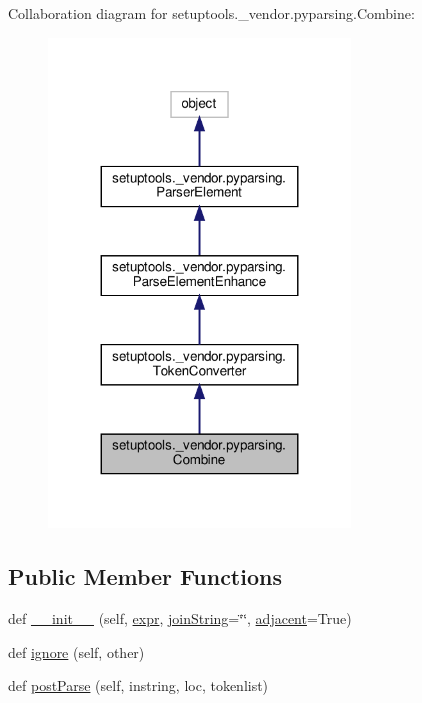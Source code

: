 Collaboration diagram for setuptools.\+\_\+vendor.\+pyparsing.\+Combine\+:
\nopagebreak
\begin{figure}[H]
\begin{center}
\leavevmode
\includegraphics[width=227pt]{classsetuptools_1_1__vendor_1_1pyparsing_1_1Combine__coll__graph}
\end{center}
\end{figure}
\subsection*{Public Member Functions}
\begin{DoxyCompactItemize}
\item 
def \hyperlink{classsetuptools_1_1__vendor_1_1pyparsing_1_1Combine_a6bc0f189d26a4ac6a5986cafb15641b5}{\+\_\+\+\_\+init\+\_\+\+\_\+} (self, \hyperlink{classsetuptools_1_1__vendor_1_1pyparsing_1_1ParseElementEnhance_a445450bd765a74cc1d1567e40cade40d}{expr}, \hyperlink{classsetuptools_1_1__vendor_1_1pyparsing_1_1Combine_acf8657472adde6974dc62fd9f34a337a}{join\+String}=\char`\"{}\char`\"{}, \hyperlink{classsetuptools_1_1__vendor_1_1pyparsing_1_1Combine_af72a8e1f083c2a312c268bf1e49e0d7a}{adjacent}=True)
\item 
def \hyperlink{classsetuptools_1_1__vendor_1_1pyparsing_1_1Combine_a84cbd8b1c653fb08b5a77fc26b83b005}{ignore} (self, other)
\item 
def \hyperlink{classsetuptools_1_1__vendor_1_1pyparsing_1_1Combine_af1a6aa53e409c35e5c28c8ccb9fc62d7}{post\+Parse} (self, instring, loc, tokenlist)
\end{DoxyCompactItemize}
